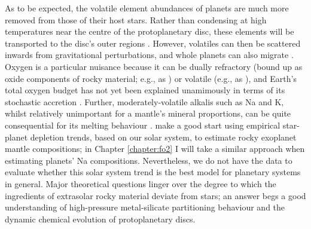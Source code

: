 As to be expected, the volatile element abundances of planets are much more removed from those of their host stars. Rather than condensing at high temperatures near the centre of the protoplanetary disc, these elements will be transported to the disc's outer regions \citep{ringwood_significance_1989, cassen_models_1996, ciesla_radial_2008}. However, volatiles can then be scattered inwards from gravitational perturbations, and whole planets can also migrate \citep[e.g.,][]{unterborn_inward_2018, raymond_migrationdriven_2018}. Oxygen is a particular nuisance because it can be dually refractory (bound up as oxide components of rocky material; e.g., as ) or volatile (e.g., as ), and Earth's total oxygen budget has not yet been explained unamimously in terms of its stochastic accretion \citep[e.g.,][]{raymond_making_2004, morbidelli_building_2012, rubie_accretion_2015, obrien_delivery_2018, sossi_stochastic_2022}. Further, moderately-volatile alkalis such as Na and K, whilst relatively unimportant for a mantle's mineral proportions, can be quite consequential for its melting behaviour \citep{hirschmann_mantle_2000}. \citet{wang_detailed_2022} make a good start using empirical star-planet depletion trends, based on our solar system, to estimate rocky exoplanet mantle compositions; in Chapter \ref{chapter:fo2} I will take a similar approach when estimating planets' Na compositions. Nevertheless, we do not have the data to evaluate whether this solar system trend is the best model for planetary systems in general. Major theoretical questions linger over the degree to which the ingredients of extrasolar rocky material deviate from stars; an answer begs a good understanding of high-pressure metal-silicate partitioning behaviour and the dynamic chemical evolution of protoplanetary discs.


